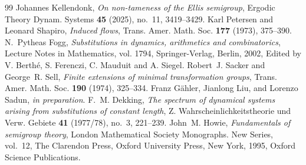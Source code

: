 \documentclass[10pt,a4paper]{amsart}
\numberwithin{equation}{section}
\begin{document}
\begin{thebibliography}{99}
 Johannes Kellendonk, \emph{On non-tameness of the {E}llis semigroup}, Ergodic Theory Dynam. Systems \textbf{45} (2025), no.~11, 3419--3429. 
 Karl Petersen and Leonard Shapiro, \emph{Induced flows}, Trans. Amer. Math. Soc. \textbf{177} (1973), 375--390. 
 N.~Pytheas Fogg, \emph{Substitutions in dynamics, arithmetics and combinatorics}, Lecture Notes in Mathematics, vol. 1794, Springer-Verlag, Berlin, 2002, Edited by V. Berth\'{e}, S. Ferenczi, C. Mauduit and A. Siegel. 
 Robert~J. Sacker and George~R. Sell, \emph{Finite extensions of minimal transformation groups}, Trans. Amer. Math. Soc. \textbf{190} (1974), 325--334. 
 Franz G\"ahler, Jianlong Liu, and Lorenzo Sadun, \emph{in preparation}.
 F.~M. Dekking, \emph{The spectrum of dynamical systems arising from substitutions of constant length}, Z. Wahrscheinlichkeitstheorie und Verw. Gebiete \textbf{41} (1977/78), no.~3, 221--239. 
 John~M. Howie, \emph{Fundamentals of semigroup theory}, London Mathematical Society Monographs. New Series, vol.~12, The Clarendon Press, Oxford University Press, New York, 1995, Oxford Science Publications. 
\end{thebibliography}
\end{document}

